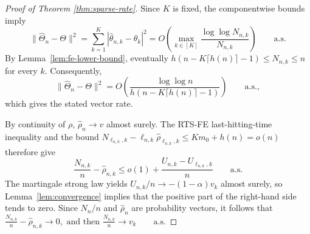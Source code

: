 \begin{proof}[Proof of Theorem \ref{thm:sparse-rate}]
	{\color{revisiongreen}
Since \(K\) is fixed, the componentwise bounds imply
\[
\|\hat\Theta_n-\Theta\|^2
=\sum_{k=1}^K|\hat\theta_{n,k}-\theta_k|^2
=O\!\left(\max_{k\in[K]}\frac{\log\log N_{n,k}}{N_{n,k}}\right)
\qquad\text{a.s.}
\]
By Lemma~\ref{lem:fe-lower-bound}, eventually
\(h(n-K\lceil h(n)\rceil-1)\leq N_{n,k}\leq n\) for every \(k\). Consequently,
\[
\|\hat\Theta_n-\Theta\|^2
=O\!\left(\frac{\log\log n}{h\!\left(n-K\lceil h(n)\rceil-1\right)}\right)
\qquad\text{a.s.},
\]
which gives the stated vector rate.

By continuity of \(\rho\), \(\hat\rho_n\to v\) almost surely. The RTS-FE last-hitting-time inequality and the bound \(N_{\ell_{n,k},k}-\ell_{n,k}\hat\rho_{\ell_{n,k},k}\leq Km_0+h(n)=o(n)\) therefore give
	\[
	\frac{N_{n,k}}n-\hat\rho_{n,k}
	\leq o(1)+\frac{U_{n,k}-U_{\ell_{n,k},k}}n
	\qquad\text{a.s.}
	\]
	The martingale strong law yields \(U_{n,k}/n\to-(1-\alpha)v_k\) almost surely, so Lemma~\ref{lem:convergence} implies that the positive part of the right-hand side tends to zero. Since \(N_n/n\) and \(\hat\rho_n\) are probability vectors, it follows that
	\(
	\frac{N_{n,k}}n-\hat\rho_{n,k}\longrightarrow0,
	\text{ and then }\frac{N_{n,k}}n\longrightarrow v_k
	\qquad\text{a.s.}
	\)}
\end{proof}
